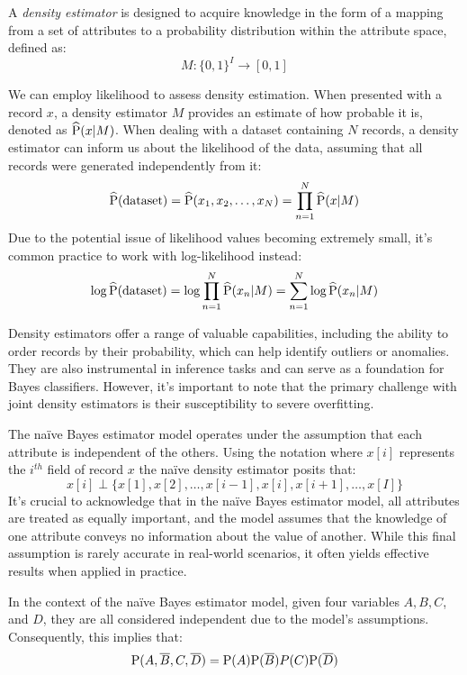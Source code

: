 \begin{definition}
    A \emph{density estimator}  is designed to acquire knowledge in the form of a mapping from a set of attributes to a probability distribution within the attribute space, defined as:
    \[M:\{0,1\}^I \rightarrow [0,1]\]
\end{definition}
We can employ likelihood to assess density estimation. 
When presented with a record $x$, a density estimator $M$ provides an estimate of how probable it is, denoted as $\widehat{\textnormal{P}}(x|M)$. 
When dealing with a dataset containing $N$ records, a density estimator can inform us about the likelihood of the data, assuming that all records were generated independently from it:
\[\widehat{\textnormal{P}}(\textnormal{dataset})=\widehat{\textnormal{P}}(x_1,x_2,\dots,x_N)=\prod_{n=1}^{N}\widehat{\textnormal{P}}(x|M)\]
Due to the potential issue of likelihood values becoming extremely small, it's common practice to work with log-likelihood instead:
\[\log{\widehat{\textnormal{P}}(\textnormal{dataset})}=\log{\prod_{n=1}^{N}{\widehat{\textnormal{P}}(x_n|M)}}=\sum_{n=1}^{N}{\log{\widehat{\textnormal{P}}(x_n|M)}}\]

Density estimators offer a range of valuable capabilities, including the ability to order records by their probability, which can help identify outliers or anomalies. 
They are also instrumental in inference tasks and can serve as a foundation for Bayes classifiers. 
However, it's important to note that the primary challenge with joint density estimators is their susceptibility to severe overfitting.

The naïve Bayes estimator model operates under the assumption that each attribute is independent of the others. 
Using the notation where $x[i]$ represents the $i^{th}$ field of record $x$ the naïve density estimator posits that:
\[x[i] \perp \{x[1],x[2],\dots,x[i-1],x[i],x[i+1],\dots,x[I]\}\]
It's crucial to acknowledge that in the naïve Bayes estimator model, all attributes are treated as equally important, and the model assumes that the knowledge of one attribute conveys no information about the value of another. 
While this final assumption is rarely accurate in real-world scenarios, it often yields effective results when applied in practice.
\begin{example}
    In the context of the naïve Bayes estimator model, given four variables $A,B,C$, and $D$, they are all considered independent due to the model's assumptions. Consequently, this implies that:
    \[\textnormal{P}(A,\overline{B},C,\overline{D}) = \textnormal{P}(A)\textnormal{P}(\overline{B})P(C)\textnormal{P}(\overline{D})\]
\end{example}

